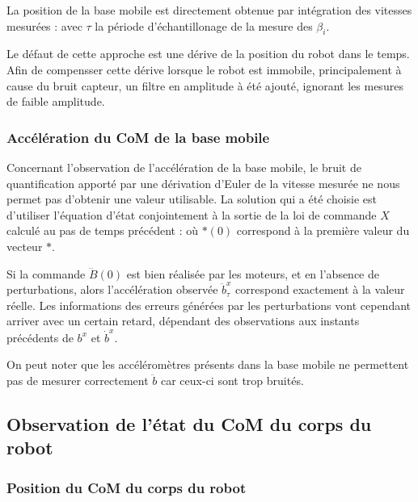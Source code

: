 				La position de la base mobile est directement obtenue par intégration des vitesses mesurées :
				avec $\tau$ la période d'échantillonage de la mesure des $\beta_i$.
				
				Le défaut de cette approche est une dérive de la position du robot dans le temps. 
				Afin de compensser cette dérive lorsque le robot est immobile, principalement à cause du bruit capteur, un filtre en amplitude à été ajouté, ignorant les mesures de faible amplitude.
				
			\subsubsection{Accélération du CoM de la base mobile}
			\label{section.observation_acc_base}
				Concernant l'observation de l'accélération de la base mobile, le bruit de quantification apporté par une dérivation d'Euler de la vitesse mesurée ne nous permet pas d'obtenir une valeur utilisable.
				La solution qui a été choisie est d'utiliser l'équation d'état  conjointement à la sortie de la loi de commande $X$ calculé au pas de temps précédent :
				où $*(0)$ correspond à la première valeur du vecteur $*$.
				
				Si la commande $\dddot{B}(0)$ est bien réalisée par les moteurs, et en l'absence de perturbations, alors l'accélération observée $\ddot{b}^x_\tau$ correspond exactement à la valeur réelle.
				Les informations des erreurs générées par les perturbations vont cependant arriver avec un certain retard, dépendant des observations aux instants précédents de $b^x$ et $\dot{b}^x$.
				
				On peut noter que les accéléromètres présents dans la base mobile ne permettent pas de mesurer correctement $\ddot{b}$ car ceux-ci sont trop bruités.
				
		\subsection{Observation de l'état du CoM du corps du robot}
			\subsubsection{Position du CoM du corps du robot}
			
